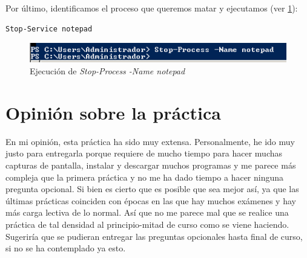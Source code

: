 Por último, identificamos el proceso que queremos matar y ejecutamos (ver \ref{stopnote}):

\begin{verbatim}
Stop-Service notepad
\end{verbatim}

\begin{figure}[H]
	\centering
	\includegraphics[scale=0.6]{stopnote.png}
	\caption{Ejecución de \textit{Stop-Process -Name notepad}} \label{stopnote}
\end{figure}

\section{Opinión sobre la práctica}
En mi opinión, esta práctica ha sido muy extensa. Personalmente, he ido muy justo para entregarla porque requiere de mucho tiempo para hacer muchas capturas de pantalla, instalar y descargar muchos programas y me parece más compleja que la primera práctica y no me ha dado tiempo a hacer ninguna pregunta opcional.
Si bien es cierto que es posible que sea mejor así, ya que las últimas prácticas coinciden con épocas en las que hay muchos exámenes y hay más carga lectiva de lo normal. Así que no me parece mal que se realice una práctica de tal densidad al principio-mitad de curso como se viene haciendo.
Sugeriría que se pudieran entregar las preguntas opcionales hasta final de curso, si no se ha contemplado ya esto.

\newpage




